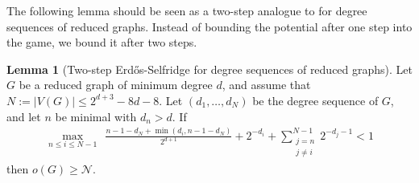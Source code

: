 \documentclass[a4paper,11pt,oneside]{scrartcl}
\theoremstyle{definition}
\newtheorem{lemma}[definition]{Lemma}
\theoremstyle{remark}
\begin{document}
The following lemma should be seen as a two-step analogue to  for degree sequences of reduced graphs. Instead of bounding the potential after one step into the game, we bound it after two steps. 

\begin{lemma}[Two-step Erd\H os-Selfridge for degree sequences of reduced graphs]\label{lemma:two_step_potential}
    Let $G$ be a reduced graph of minimum degree $d$, and assume that $N:=|V(G)| \leq 2^{d+3} - 8d - 8$. Let $(d_1,\dots,d_N)$ be the degree sequence of $G$, and let $n$ be minimal with $d_n > d$. If
    \begin{align}\label{align:two_step_potential}
        \max_{n \leq i \leq N-1}\ \ \frac{n-1-d_N+\min(d_i, n-1 - d_N)}{2^{d+1}}+ 2^{-d_i} + \sum_{\substack{j = n\\ j \neq i}}^{N-1} 2^{-d_j - 1} < 1
    \end{align}
    then $o(G) \geq \mathcal N$.
\end{lemma}
\end{document}

